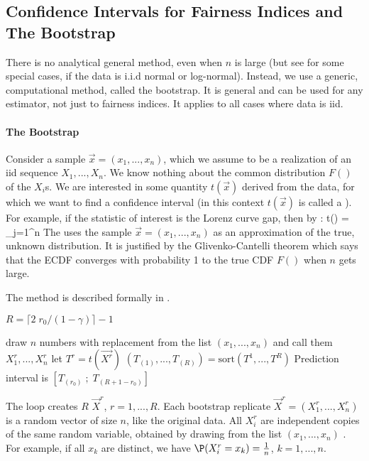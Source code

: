 \subsection{Confidence Intervals for Fairness Indices and The Bootstrap}
There is no analytical general method, even when
$n$ is large (but see \cite{verrill2003cbn} for
some special cases, if the data is i.i.d normal
or log-normal). Instead, we use a generic,
computational method, called the bootstrap. It is
general and can be used for any estimator, not
just to fairness indices. It applies to all cases
where data is iid.

\paragraph{The Bootstrap}
Consider a sample $\vec{x}=(x_1,...,x_n)$, which we assume to
be a realization of an iid sequence $X_1, ..., X_n$. We know
nothing about the common distribution $F()$ of the $X_i$s. We
are interested in some quantity $t(\vec{x})$ derived from the
data, for which we want to find a confidence interval (in this
context $t(\vec{x})$ is called a ). For example,
if the statistic of interest is the Lorenz curve gap, then by
:
 \ben
 t() = \sum_{j=1}^n 
 \een
The  uses the sample
$\vec{x}=(x_1,...,x_n)$ as an approximation of the true,
unknown distribution. It is justified by the Glivenko-Cantelli
theorem which says that the ECDF converges with probability 1
to the true CDF $F()$ when $n$ gets large.

The method is described formally in
.
\begin{algorithm}
 \begin{algorithmic}[1]
%
  \State $R=\lceil 2 \;r_0/(1-\gamma)\rceil-1$ \label{al-bs-l1}

    \State draw $n$ numbers with replacement from
the list $(x_1, ...,x_n)$ and call them
$X^r_{1},...,X^r_{n}$ \label{line-draw-xr}
    \State let $T^r=t(\vec{X^r})$ \label{al-bs-l3}
  \EndFor
  \State $\left(T_{(1)},...,T_{(R)}\right)=\mbox{sort}\left(T^1 ,...,T^R\right)$
  \State Prediction interval is
  $[T_{(r_0)}\;;\;T_{(R+1-r_0)}]$ \label{al-bs-l10}
\end{algorithmic}\label{algo-bs}
 \end{algorithm}
The loop creates $R$  $\vec{X}^r$,
$r=1,...,R$. Each bootstrap replicate
$\vec{X}^r=(X^r_1,...,X^r_n)$ is a random vector of size $n$,
like the original data. All $X^r_i$ are independent copies of
the same random variable, obtained by drawing from the list
$(x_1,...,x_n)$ . For example, if all
$x_k$ are distinct, we have $\P(X^r_i=x_k)=\frac{1}{n}$,
$k=1,...,n$.

